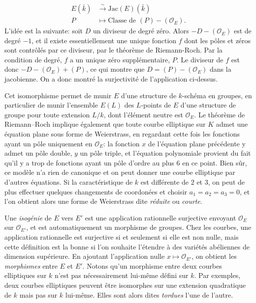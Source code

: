 \documentclass[11pt,a4paper]{article}
\renewcommand{\O}{\mathcal{O}}
\newcommand{\vers}{\longrightarrow}
\newcommand{\Jac}{\mathrm{Jac}}
\renewcommand{\v}{\vspace{5mm}}
\theoremstyle{definition}
\begin{document}
$$\begin{aligned}
E(\bar{k}) &\overset{\sim}{\vers} \Jac(E)(\bar{k}) \\
P &\longmapsto \text{Classe de } (P) - (\O_E).
\end{aligned}$$
L'idée est la suivante: soit $D$ un diviseur de degré zéro. Alors $-D - (\O_E)$ est de degré $-1$, et il existe essentiellement une unique fonction $f$ dont les pôles et zéros sont contrôlés par ce diviseur, par le théorème de Riemann-Roch. Par la condition de degré, $f$ a un unique zéro supplémentaire, $P$. Le diviseur de $f$ est donc $- D - (\O_E) + (P)$, ce qui montre que $D = (P) - (\O_E)$ dans la jacobienne. On a donc montré la surjectivité de l'application ci-dessus.

Cet isomorphisme permet de munir $E$ d'une structure de $k$-schéma en groupes, en particulier de munir l'ensemble $E(L)$ des $L$-points de $E$ d'une structure de groupe pour toute extension $L/k$, dont l'élément neutre est $\O_E$. Le théorème de Riemann--Roch implique également que toute courbe elliptique sur $K$ admet une équation plane sous forme de Weierstrass, en regardant cette fois les fonctions ayant un pôle uniquement en $\O_E$: la fonction $x$ de l'équation plane précédente y admet un pôle double, $y$ un pôle triple, et l'équation polynomiale provient du fait qu'il y a trop de fonctions ayant un pôle d'ordre au plus 6 en ce point. Bien sûr, ce modèle n'a rien de canonique et on peut donner une courbe elliptique par d'autres équations. Si la caractéristique de $k$ est différente de 2 et 3, on peut de plus effectuer quelques changements de coordonées et choisir $a_1 = a_2 = a_3 = 0$, et l'on obtient alors une forme de Weierstrass dite \emph{réduite} ou \emph{courte}.

\v

Une \emph{isogénie} de $E$ vers $E'$ est une application rationnelle surjective envoyant $\O_E$ sur $\O_{E'}$, et est automatiquement un morphisme de groupes. Chez les courbes, une application rationnelle est surjective si et seulement si elle est non nulle, mais cette définition est la bonne si l'on souhaite l'étendre à des variétés abéliennes de dimension supérieure. En ajoutant l'application nulle $x\mapsto \O_{E'}$, on obtient les \emph{morphismes} entre $E$ et $E'$. Notons qu'un morphisme entre deux courbes elliptiques sur $k$ n'est pas nécessairement lui-même défini sur $k$. Par exemples, deux courbes elliptiques peuvent être isomorphes sur une extension quadratique de $k$ mais pas sur $k$ lui-même. Elles sont alors dites \emph{tordues} l'une de l'autre.
\end{document}
